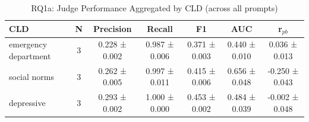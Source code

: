 \begin{table}[htbp]
\centering
\caption{RQ1a: Judge Performance Aggregated by CLD (across all prompts)}
\label{tab:rq1a_by_cld}
\begin{tabular}{lcccccc}
\toprule
\textbf{CLD} & \textbf{N} & \textbf{Precision} & \textbf{Recall} & \textbf{F1} & \textbf{AUC} & \textbf{r$_{pb}$} \\
\midrule
emergency department & 3 & 0.228 ± 0.002 & 0.987 ± 0.006 & 0.371 ± 0.003 & 0.440 ± 0.010 & 0.036 ± 0.013 \\
social norms & 3 & 0.262 ± 0.005 & 0.997 ± 0.011 & 0.415 ± 0.006 & 0.656 ± 0.048 & -0.250 ± 0.043 \\
depressive & 3 & 0.293 ± 0.002 & 1.000 ± 0.000 & 0.453 ± 0.002 & 0.484 ± 0.039 & -0.002 ± 0.048 \\
\bottomrule
\end{tabular}
\end{table}